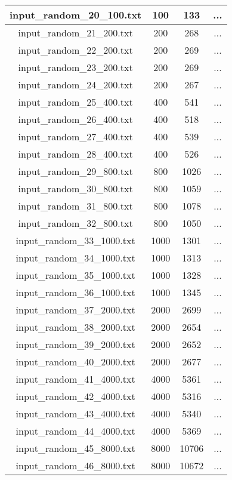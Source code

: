 \begin{longtable}{|c|c|c|c|}
		input\_random\_20\_100.txt & 100 & 133 & ... \\ \hline
		input\_random\_21\_200.txt & 200 & 268 & ... \\ \hline
		input\_random\_22\_200.txt & 200 & 269 & ... \\ \hline
		input\_random\_23\_200.txt & 200 & 269 & ... \\ \hline
		input\_random\_24\_200.txt & 200 & 267 & ... \\ \hline
		input\_random\_25\_400.txt & 400 & 541 & ... \\ \hline
		input\_random\_26\_400.txt & 400 & 518 & ... \\ \hline
		input\_random\_27\_400.txt & 400 & 539 & ... \\ \hline
		input\_random\_28\_400.txt & 400 & 526 & ... \\ \hline
		input\_random\_29\_800.txt & 800 & 1026 & ... \\ \hline
		input\_random\_30\_800.txt & 800 & 1059 & ... \\ \hline
		input\_random\_31\_800.txt & 800 & 1078 & ... \\ \hline
		input\_random\_32\_800.txt & 800 & 1050 & ... \\ \hline
		input\_random\_33\_1000.txt & 1000 & 1301 & ... \\ \hline
		input\_random\_34\_1000.txt & 1000 & 1313 & ... \\ \hline
		input\_random\_35\_1000.txt & 1000 & 1328 & ... \\ \hline
		input\_random\_36\_1000.txt & 1000 & 1345 & ... \\ \hline
		input\_random\_37\_2000.txt & 2000 & 2699 & ... \\ \hline
		input\_random\_38\_2000.txt & 2000 & 2654 & ... \\ \hline
		input\_random\_39\_2000.txt & 2000 & 2652 & ... \\ \hline
		input\_random\_40\_2000.txt & 2000 & 2677 & ... \\ \hline
		input\_random\_41\_4000.txt & 4000 & 5361 & ... \\ \hline
		input\_random\_42\_4000.txt & 4000 & 5316 & ... \\ \hline
		input\_random\_43\_4000.txt & 4000 & 5340 & ... \\ \hline
		input\_random\_44\_4000.txt & 4000 & 5369 & ... \\ \hline
		input\_random\_45\_8000.txt & 8000 & 10706 & ... \\ \hline
		input\_random\_46\_8000.txt & 8000 & 10672 & ... \\ \hline

\end{longtable}
